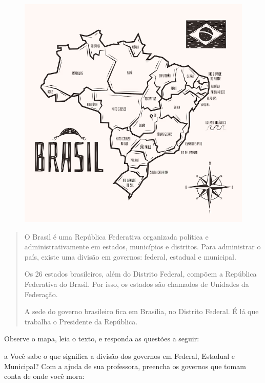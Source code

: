 

\begin{figure}[htpb!]
\includegraphics[width=.5\textwidth]{./imgs/img46.png}
\caption{}
\end{figure}

\begin{quote}
O Brasil é uma República Federativa organizada política e
administrativamente em estados, municípios e distritos. Para administrar
o país, existe uma divisão em governos: federal, estadual e municipal.

Os 26 estados brasileiros, além do Distrito Federal, compõem a República
Federativa do Brasil. Por isso, os estados são chamados de Unidades da
Federação.

A sede do governo brasileiro fica em Brasília, no Distrito Federal. É lá
que trabalha o Presidente da República.

\end{quote}

Observe o mapa, leia o texto, e responda as questões a seguir:

\num{a} Você sabe o que significa a divisão dos governos em Federal, Estadual e
Municipal? Com a ajuda de sua professora, preencha os governos que tomam
conta de onde você mora:

